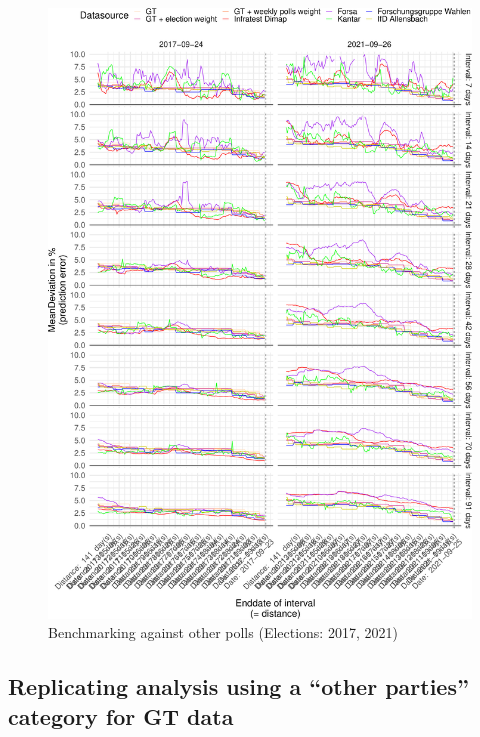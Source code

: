 \documentclass[
  letterpaper,
  DIV=11,
  numbers=noendperiod]{scrartcl}
\begin{document}
\begin{figure}[H]

\caption{\label{fig-A11}Benchmarking against other polls (Elections:
2017, 2021)}

{\centering \includegraphics{figures/fig-A11-1.pdf}

}

\end{figure}

\hypertarget{replicating-analysis-using-a-other-parties-category-for-gt-data}{%
\subsection{Replicating analysis using a ``other parties'' category for
GT
data}\label{replicating-analysis-using-a-other-parties-category-for-gt-data}}
\end{document}
